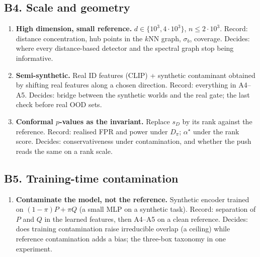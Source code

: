 \documentclass[10pt]{article}
\newcommand{\hd}[1]{\textbf{#1}}
\begin{document}
\subsection*{B4. Scale and geometry}
\begin{enumerate}[leftmargin=*,itemsep=2pt]
\item \hd{High dimension, small reference.} $d\in\{10^3,4\cdot10^3\}$, $n\le 2\cdot10^3$. Record: distance concentration, hub points in the $k$NN graph, $\sigma_b$, coverage. Decides: where every distance-based detector and the spectral graph stop being informative.
\item \hd{Semi-synthetic.} Real ID features (CLIP) + synthetic contaminant obtained by shifting real features along a chosen direction. Record: everything in A4--A5. Decides: bridge between the synthetic worlds and the real gate; the last check before real OOD sets.
\item \hd{Conformal $p$-values as the invariant.} Replace $s_D$ by its rank against the reference. Record: realised FPR and power under $D_\pi$; $\alpha^\star$ under the rank score. Decides: conservativeness under contamination, and whether the push reads the same on a rank scale.
\end{enumerate}

\subsection*{B5. Training-time contamination}
\begin{enumerate}[leftmargin=*,itemsep=2pt]
\item \hd{Contaminate the model, not the reference.} Synthetic encoder trained on $(1-\pi)P+\pi Q$ (a small MLP on a synthetic task). Record: separation of $P$ and $Q$ in the learned features, then A4--A5 on a clean reference. Decides: does training contamination raise irreducible overlap (a ceiling) while reference contamination adds a bias; the three-box taxonomy in one experiment.
\end{enumerate}
\end{document}
